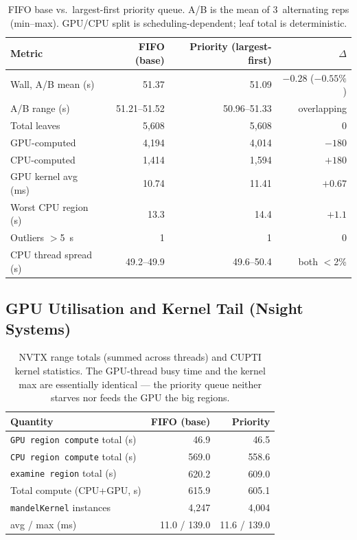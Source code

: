 \documentclass[
	english,
	letterpaper, oneside
]{article}
\begin{document}
\begin{table}[H]
    \centering
    \caption{FIFO base vs.\ largest-first priority queue. A/B is the mean of
             3~alternating reps (min--max). GPU/CPU split is scheduling-dependent;
             leaf total is deterministic.}
    \label{tab:pq}
    \begin{tabular}{lrrr}
        \hline
        Metric & FIFO (base) & Priority (largest-first) & $\Delta$ \\
        \hline
        Wall, A/B mean (s)        & 51.37 & 51.09 & $-0.28$ ($-0.55\%$) \\
        \quad A/B range (s)       & 51.21--51.52 & 50.96--51.33 & overlapping \\
        Total leaves              & 5{,}608 & 5{,}608 & 0 \\
        \quad GPU-computed        & 4{,}194 & 4{,}014 & $-180$ \\
        \quad CPU-computed        & 1{,}414 & 1{,}594 & $+180$ \\
        GPU kernel avg (ms)       & 10.74 & 11.41 & $+0.67$ \\
        Worst CPU region (s)      & 13.3 & 14.4 & $+1.1$ \\
        Outliers $>$5~s           & 1 & 1 & 0 \\
        CPU thread spread (s)     & 49.2--49.9 & 49.6--50.4 & both $<$2\% \\
        \hline
    \end{tabular}
\end{table}

\subsection{GPU Utilisation and Kernel Tail (Nsight Systems)}

\begin{table}[H]
    \centering
    \caption{NVTX range totals (summed across threads) and CUPTI kernel
             statistics. The GPU-thread busy time and the kernel max are
             essentially identical --- the priority queue neither starves nor
             feeds the GPU the big regions.}
    \label{tab:pq-nsys}
    \begin{tabular}{lrr}
        \hline
        Quantity & FIFO (base) & Priority \\
        \hline
        \texttt{GPU region compute} total (s) & 46.9 & 46.5 \\
        \texttt{CPU region compute} total (s) & 569.0 & 558.6 \\
        \texttt{examine region} total (s)     & 620.2 & 609.0 \\
        Total compute (CPU+GPU, s)            & 615.9 & 605.1 \\
        \texttt{mandelKernel} instances       & 4{,}247 & 4{,}004 \\
        \quad avg / max (ms)                  & 11.0 / 139.0 & 11.6 / 139.0 \\
        \hline
    \end{tabular}
\end{table}
\end{document}
